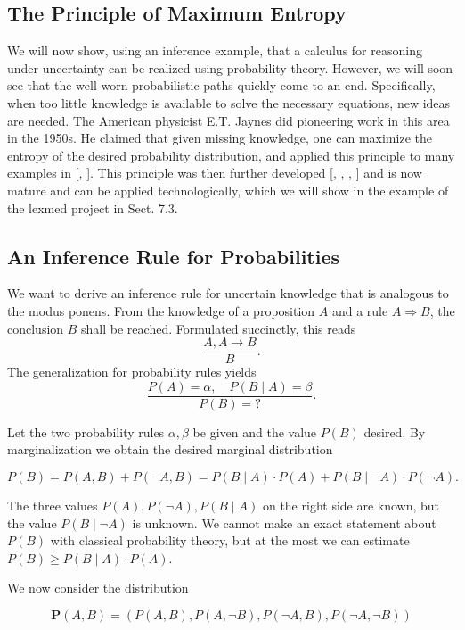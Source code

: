 \documentclass[10pt]{book}
\begin{document}
\subsection{The Principle of Maximum Entropy}
We will now show, using an inference example, that a calculus for reasoning under uncertainty can be realized using probability theory. However, we will soon see that the well-worn probabilistic paths quickly come to an end. Specifically, when too little knowledge is available to solve the necessary equations, new ideas are needed. The American physicist E.T. Jaynes did pioneering work in this area in the 1950s. He claimed that given missing knowledge, one can maximize the entropy of the desired probability distribution, and applied this principle to many examples in [\cite{jaynes1957itsm}, \cite{jaynes2003probability}]. This principle was then further developed [\cite{cheeseman1983generalised}, \cite{nilsson1986probabilistic}, \cite{kane1989maxent}, \cite{kapur1992entropy}] and is now mature and can be applied technologically, which we will show in the example of the lexmed project in Sect. 7.3.

\subsection{An Inference Rule for Probabilities}
We want to derive an inference rule for uncertain knowledge that is analogous to the modus ponens. From the knowledge of a proposition $A$ and a rule $A \Rightarrow B$, the conclusion $B$ shall be reached. Formulated succinctly, this reads
$$
\frac{A, A \rightarrow B}{B} .
$$
The generalization for probability rules yields
$$
\frac{P(A)=\alpha, \quad P(B \mid A)=\beta}{P(B)=?} .
$$

Let the two probability rules $\alpha, \beta$ be given and the value $P(B)$ desired. By marginalization we obtain the desired marginal distribution

$$
P(B)=P(A, B)+P(\neg A, B)=P(B \mid A) \cdot P(A)+P(B \mid \neg A) \cdot P(\neg A) .
$$

The three values $P(A), P(\neg A), P(B \mid A)$ on the right side are known, but the value $P(B \mid \neg A)$ is unknown. We cannot make an exact statement about $P(B)$ with classical probability theory, but at the most we can estimate $P(B) \geq P(B \mid A) \cdot P(A)$.

We now consider the distribution

$$
\boldsymbol{P}(A, B)=(P(A, B), P(A, \neg B), P(\neg A, B), P(\neg A, \neg B))
$$
\end{document}
